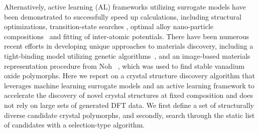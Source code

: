 %
Alternatively, active learning (AL) frameworks utilizing surrogate models have been demonstrated to successfully speed up  calculations, including structural optimizations\cite{hansen2019atomistic}, transition-state searches \cite{torres2019low}, optimal alloy nano-particle compositions~\cite{Jennings2019} and fitting of inter-atomic potentials.\cite{podryabinkin2017active}
%
There have been numerous recent efforts in developing unique approaches to materials discovery, including a tight-binding model utilizing genetic algorithms~\cite{VanDenBossche2018}, and an image-based materials representation procedure from Noh ~\cite{noh2019inverse}, which was used to find stable vanadium oxide polymorphs.
%
%
Here we report on a crystal structure discovery algorithm that leverages machine learning surrogate models and an active learning framework to accelerate the discovery of novel crystal structures at fixed composition and does not rely on large sets of generated DFT data.
%
%
We first define a set of structurally diverse candidate crystal polymorphs, and secondly, search through the static list of candidates with a selection-type algorithm.
%
%
%
%


